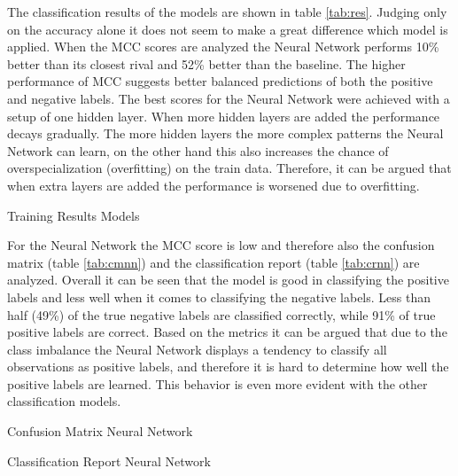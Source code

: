 The classification results of the models are shown in table \ref{tab:res}.
Judging only on the accuracy alone it does not seem to make a great difference which model is applied.
When the MCC scores are analyzed the Neural Network performs 10\% better than its closest rival and 52\% better than the baseline.
The higher performance of MCC suggests better balanced predictions of both the positive and negative labels.
The best scores for the Neural Network were achieved with a setup of one hidden layer.
When more hidden layers are added the performance decays gradually.
The more hidden layers the more complex patterns the Neural Network can learn, on the other hand this also increases the chance of overspecialization (overfitting) on the train data.
Therefore, it can be argued that when extra layers are added the performance is worsened due to overfitting.

\begin{table}[h]
\begin{footnotesize}

\end{footnotesize}
\caption{\label{tab:res} \footnotesize{Training Results Models}}
\end{table}

For the Neural Network the MCC score is low and therefore also the confusion matrix (table \ref{tab:cmnn}) and the classification report (table \ref{tab:crnn}) are analyzed.
Overall it can be seen that the model is good in classifying the positive labels and less well when it comes to classifying the negative labels.
Less than half (49\%) of the true negative labels are classified correctly, while 91\% of true positive labels are correct. 
Based on the metrics it can be argued that due to the class imbalance the Neural Network displays a tendency to classify all observations as positive labels, and therefore it is hard to determine how well the positive labels are learned.
This behavior is even more evident with the other classification models.

\begin{table}[h]
\begin{footnotesize}

\end{footnotesize}
\caption{\label{tab:cmnn} \footnotesize{Confusion Matrix Neural Network}}
\end{table}

\begin{table}[h]
\begin{footnotesize}

\end{footnotesize}
\caption{\label{tab:crnn} \footnotesize{Classification Report Neural Network}}
\end{table}

